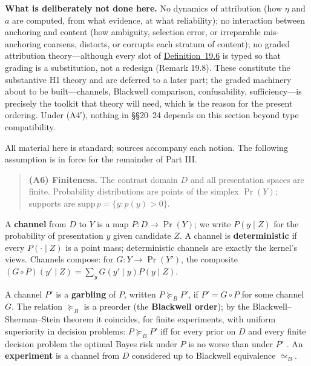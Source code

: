 \textbf{What is deliberately not done here.} No dynamics of attribution (how \(\eta\) and \(a\) are computed, from what evidence, at what reliability); no interaction between anchoring and content (how ambiguity, selection error, or irreparable mis-anchoring coarsens, distorts, or corrupts each stratum of content); no graded attribution theory---\hspace{0pt}although every slot of \hyperlink{stmt:19.6}{Definition~19.6} is typed so that grading is a substitution, not a redesign (Remark 19.8). These constitute the substantive H1 theory and are deferred to a later part; the graded machinery about to be built---\hspace{0pt}channels, Blackwell comparison, confusability, sufficiency---\hspace{0pt}is precisely the toolkit that theory will need, which is the reason for the present ordering. Under (A4′), nothing in §§20--24 depends on this section beyond type compatibility.


All material here is standard; sources accompany each notion. The following assumption is in force for the remainder of Part III.

\begin{quote}
\textbf{(A6) Finiteness.} The contrast domain \(D\) and all presentation spaces are finite. Probability distributions are points of the simplex \(\Pr(Y)\); supports are \(\mathrm{supp}\,p = \{y : p(y) > 0\}\).
\end{quote}


A \textbf{channel} from \(D\) to \(Y\) is a map \(P : D \to \Pr(Y)\); we write \(P(y \mid Z)\) for the probability of presentation \(y\) given candidate \(Z\). A channel is \textbf{deterministic} if every \(P(\cdot \mid Z)\) is a point mass; deterministic channels are exactly the kernel's views. Channels compose: for \(G : Y \to \Pr(Y')\), the composite \((G \circ P)(y' \mid Z) = \sum_y G(y' \mid y) P(y \mid Z)\).

A channel \(P'\) is a \textbf{garbling} of \(P\), written \(P \succeq_B P'\), if \(P' = G \circ P\) for some channel \(G\). The relation \(\succeq_B\) is a preorder (the \textbf{Blackwell order}); by the Blackwell--Sherman--Stein theorem it coincides, for finite experiments, with uniform superiority in decision problems: \(P \succeq_B P'\) iff for every prior on \(D\) and every finite decision problem the optimal Bayes risk under \(P\) is no worse than under \(P'\) \autocite{blackwell1951,blackwell1953,torgersen1991}. An \textbf{experiment} is a channel from \(D\) considered up to Blackwell equivalence \(\simeq_B\).

